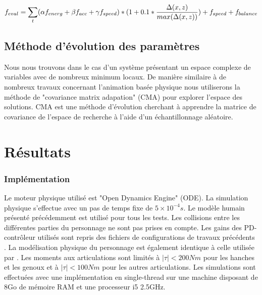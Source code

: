 \documentclass[runningheads,a4paper]{llncs}
\begin{document}
\begin{equation}
f_{eval} =\sum_{\substack{t}} (\alpha f_{energ} + \beta f_{acc} + \gamma f_{speed})*(1+0.1*\frac{\Delta(x,z)}{max(\Delta(x,z))}) \\
+ f_{speed} + f_{balance}
\label{eq:complete_eval}
\end{equation}



%
\subsection{Méthode d'évolution des paramètres}
Nous nous trouvons dans le cas d'un système présentant un espace complexe de variables avec de nombreux minimum locaux. De manière similaire à de nombreux travaux concernant l'animation basée physique \cite{geijtenbeek2012simple,tan2011articulated} nous utiliserons la méthode de "covariance matrix adapation" (CMA) \cite{hansen2006cma} pour explorer l'espace des solutions. CMA est une méthode d'évolution cherchant à apprendre la matrice de covariance de l'espace de recherche à l'aide d'un échantillonnage aléatoire.




%
\section{Résultats}
\label{sec:resultats}
%
\subsubsection{Implémentation}
Le moteur physique utilisé est "Open Dynamics Engine" (ODE). La simulation physique s'effectue avec un pas de temps fixe de $5 \times 10^{-4}s$. Le modèle humain présenté précédemment est utilisé pour tous les tests. Les collisions entre les différentes parties du personnage ne sont pas prises en compte. Les gains des PD-contrôleur utilisés sont repris des fichiers de configurations de travaux précédents \cite{coros2009robust}. La modélisation physique du personnage est également identique à celle utilisée par \cite{coros2009robust}. Les moments aux articulations sont limités à $|\tau|<200Nm$ pour les hanches et les genoux et à $|\tau|<100Nm$ pour les autres articulations.
Les simulations sont effectuées avec une implémentation en single-thread sur une machine disposant de 8Go de mémoire RAM et une processeur i5 2.5GHz.
\end{document}
